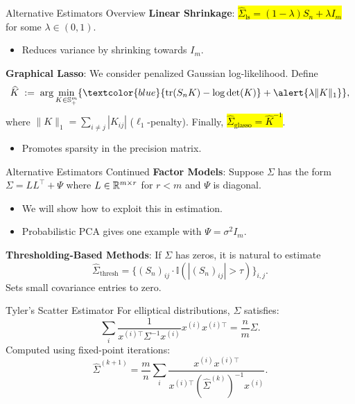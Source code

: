\documentclass[11pt,handout,aspectratio=169]{beamer}
\begin{document}
\begin{frame}{Alternative Estimators Overview}
  \textbf{Linear Shrinkage}: \hl{$\widehat{\Sigma}_{\text{ls}} = (1 - \lambda) S_n + \lambda I_m$} for some $\lambda\in (0,1)$.
  \begin{itemize}
  	\item Reduces variance by shrinking towards $I_m$.\\[5mm]
  \end{itemize}
  
 
  \textbf{Graphical Lasso}: We consider penalized Gaussian log-likelihood. Define
   \[\widehat{K} \;:=\; \arg\min_{K\in \mathbb S^m_+ }\{\textcolor{blue}{\mathrm{tr}(S_nK)-\log\det(K)}+\alert{\lambda\|K\|_1}\},\]
   where $\|K\|_1=\sum_{i\neq j}|K_{ij}|$ ($\ell_1$-penalty). Finally, 
  \hl{$\widehat \Sigma_{\text{glasso}}=\widehat K^{-1}$}.
  \begin{itemize}
  	\item Promotes sparsity in the precision matrix.
  \end{itemize}
\end{frame}

\begin{frame}{Alternative Estimators Continued}
  \textbf{Factor Models}: Suppose $\Sigma$ has the form
  $\Sigma = LL^\top + \Psi$ 
  where $L\in \mathbb R^{m\times r}$ for $r<m$ and $\Psi$ is diagonal.
  \begin{itemize}
  	\item We will show how to exploit this in estimation.
  	\item Probabilistic PCA gives one example with $\Psi=\sigma^2 I_m$. \\[5mm]
  \end{itemize}
  
  
  \textbf{Thresholding-Based Methods}: If $\Sigma$ has zeros, it is natural to estimate
  \[\widehat{\Sigma}_{\text{thresh}} = \{(S_n)_{ij} \cdot \mathbb{I}(|(S_n)_{ij}|>\tau)\}_{i,j}.\]
  Sets small covariance entries to zero.
\end{frame}

\begin{frame}{Tyler's Scatter Estimator}
  For elliptical distributions, $\Sigma$ satisfies:
  \[\sum_i \frac{1}{x^{(i)\top}\Sigma^{-1}x^{(i)}}x^{(i)}x^{(i)\top} = \frac{n}{m}\Sigma.\]
  Computed using fixed-point iterations:
  \[\hat{\Sigma}^{(k+1)} = \frac{m}{n}\sum_{i}\frac{x^{(i)}x^{(i)\top}}{x^{(i)\top}(\hat{\Sigma}^{(k)})^{-1}x^{(i)}}.\]
\end{frame}
\end{document}
